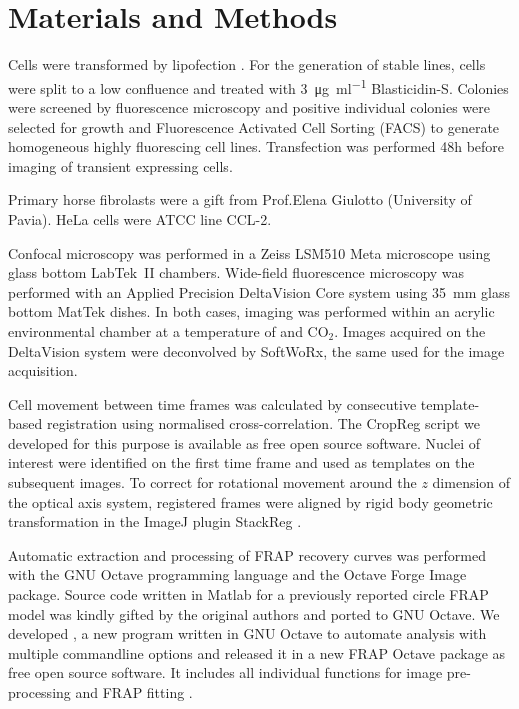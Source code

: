 \section{Materials and Methods}

  Cells were transformed by lipofection .
  For the generation of stable lines,
  cells were split to a low confluence and treated
  with \SI{3}{\ug\per\ml} \mbox{Blasticidin-S}.
  Colonies were screened by fluorescence microscopy
  and positive individual colonies were selected for growth
  and Fluorescence Activated Cell Sorting (FACS) to generate
  homogeneous highly fluorescing cell lines.
  Transfection was performed 48h before imaging of
  transient expressing cells.

  Primary horse fibrolasts were a gift from Prof.\@ Elena Giulotto
  (University of Pavia). HeLa cells were ATCC line CCL-2.

  Confocal microscopy was performed in a Zeiss LSM510 Meta microscope
  using glass bottom LabTek~II chambers.  Wide-field fluorescence
  microscopy was performed with an Applied Precision DeltaVision Core
  system using \SI{35}{\mm} glass bottom MatTek dishes.  In both
  cases, imaging was performed within an acrylic environmental chamber
  at a temperature of  and  CO$_2$.
  Images acquired on the DeltaVision system were deconvolved by
  SoftWoRx, the same used for the image acquisition.


  Cell movement between time frames was calculated by consecutive
  template-based registration using normalised cross-correlation.
  The CropReg script we developed for this purpose is available
  as free open source software. Nuclei of interest were identified
  on the first time frame and used as templates on the subsequent images.
  To correct for rotational movement
  around the $z$ dimension of the optical axis system,
  registered frames were aligned by rigid body geometric transformation
  in the ImageJ \citep{imagej1} plugin StackReg \citep{stackreg}.

  Automatic extraction and processing of FRAP recovery curves was
  performed with the GNU Octave programming language \citep{octave}
  and the Octave Forge Image package.  Source code written in Matlab
  for a previously reported circle FRAP model \citep{mcnally-frap-code}
  was kindly gifted by the original authors and ported to GNU Octave.
  We developed , a new program written in GNU Octave
  to automate analysis with multiple commandline options
  and released it in a new FRAP Octave package as free open source software.
  It includes all individual functions for image
  pre-processing and FRAP fitting .
